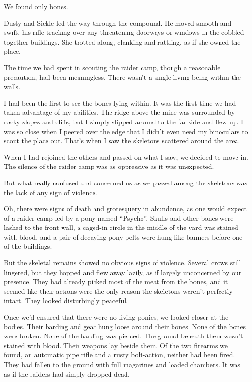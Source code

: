 We found only bones.

Dusty and Sickle led the way through the compound. He moved smooth and swift, his rifle tracking over any threatening doorways or windows in the cobbled-together buildings. She trotted along, clanking and rattling, as if she owned the place.

The time we had spent in scouting the raider camp, though a reasonable precaution, had been meaningless. There wasn’t a single living being within the walls.

I had been the first to see the bones lying within. It was the first time we had taken advantage of my abilities. The ridge above the mine was surrounded by rocky slopes and cliffs, but I simply slipped around to the far side and flew up. I was so close when I peered over the edge that I didn’t even need my binoculars to scout the place out. That’s when I saw the skeletons scattered around the area.

When I had rejoined the others and passed on what I saw, we decided to move in. The silence of the raider camp was as oppressive as it was unexpected.

But what really confused and concerned us as we passed among the skeletons was the lack of any sign of violence.

Oh, there were signs of death and grotesquery in abundance, as one would expect of a raider camp led by a pony named “Psycho”. Skulls and other bones were lashed to the front wall, a caged-in circle in the middle of the yard was stained with blood, and a pair of decaying pony pelts were hung like banners before one of the buildings.

But the skeletal remains showed no obvious signs of violence. Several crows still lingered, but they hopped and flew away lazily, as if largely unconcerned by our presence. They had already picked most of the meat from the bones, and it seemed like their actions were the only reason the skeletons weren’t perfectly intact. They looked disturbingly peaceful.

Once we’d ensured that there were no living ponies, we looked closer at the bodies. Their barding and gear hung loose around their bones. None of the bones were broken. None of the barding was pierced. The ground beneath them wasn’t stained with blood. Their weapons lay beside them. Of the two firearms we found, an automatic pipe rifle and a rusty bolt-action, neither had been fired. They had fallen to the ground with full magazines and loaded chambers. It was as if the raiders had simply dropped dead.

